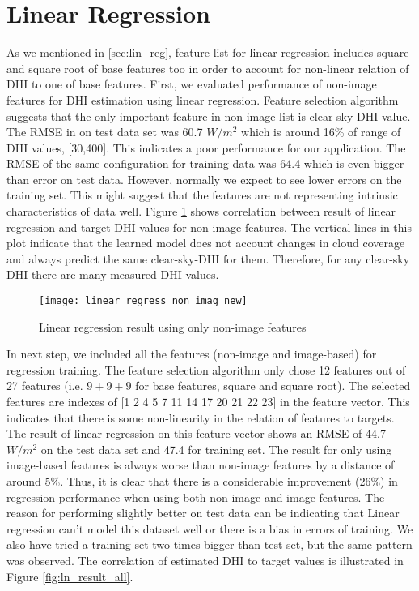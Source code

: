 \section{Linear Regression}
As we mentioned in \ref{sec:lin_reg}, feature list for linear regression includes square and square root of base features too in order to account for non-linear relation of DHI to one of base features. 
First, we evaluated performance of non-image features for DHI estimation using linear regression. Feature selection algorithm suggests that the only important feature in non-image list is clear-sky DHI value. The RMSE in on test data set was 60.7 $W/m^2$ which is around 16\% of range of DHI values, [30,400]. This indicates a poor performance for our application. The RMSE of the same configuration for training data was 64.4 which is even bigger than error on test data. However, normally we expect to see lower errors on the training set. This might suggest that the features are not representing intrinsic characteristics of data well. Figure \ref{fig:ln_result_no_image} shows correlation between result of linear regression and target DHI values for non-image features. The vertical lines in this plot indicate that the learned model does not account changes in cloud coverage and always predict the same clear-sky-DHI for them. Therefore, for any clear-sky DHI there are many measured DHI values.

\begin{figure}[h!]
\caption{Linear regression result using only non-image features}
\label{fig:ln_result_no_image}
\texttt{[image: linear\_regress\_non\_imag\_new]}
\centering
\end{figure}

In next step, we included all the features (non-image and image-based) for regression training. The feature selection algorithm only chose 12 features out of 27 features (i.e. $9+9+9$ for base features, square and square root). The selected features are indexes of [1 2 4 5 7 11 14 17 20 21 22 23] in the feature vector. This indicates that there is some non-linearity in the relation of features to targets. The result of linear regression on this feature vector shows an RMSE of 44.7  $W/m^2$ on the test data set and 47.4 for training set. The result for only using image-based features is always worse than non-image features by a distance of around 5\%. Thus, it is clear that there is a considerable improvement (26\%) in regression performance when using both non-image and image features. The reason for performing slightly better on test data can be indicating that Linear regression can't model this dataset well or there is a bias in errors of training. We also have tried a training set two times bigger than test set, but the same pattern was observed. The correlation of estimated DHI to target values is illustrated in Figure \ref{fig:ln_result_all}. 

